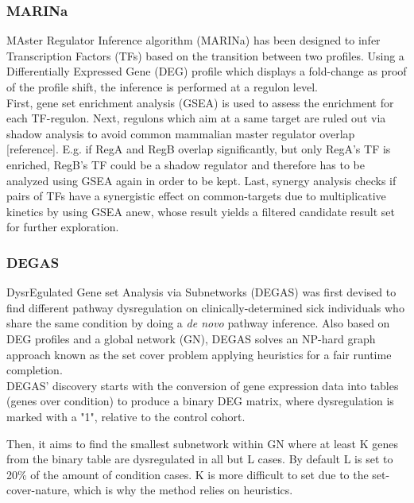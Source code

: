 \subsubsection{MARINa}
MAster Regulator Inference algorithm (MARINa) \cite{Lefebvre2010ACenters} has been designed to infer Transcription Factors (TFs) based on the transition between two profiles. Using a Differentially Expressed Gene (DEG) profile which displays a fold-change as proof of the profile shift, the inference is performed at a regulon level.
\\

First, gene set enrichment analysis (GSEA) \cite{Subramanian2005GeneProfiles} is used to assess the enrichment for each TF-regulon. Next, regulons which aim at a same target are ruled out via shadow analysis to avoid common mammalian master regulator overlap [reference]. E.g. if  RegA and RegB overlap significantly, but only RegA's TF is enriched, RegB’s TF could be a shadow regulator and therefore has to be analyzed using GSEA again in order to be kept.
Last, synergy analysis checks if pairs of TFs have a synergistic effect on common-targets due to multiplicative kinetics by using GSEA anew, whose result yields a filtered candidate result set for further exploration.

\subsubsection{DEGAS}
DysrEgulated Gene set Analysis via Subnetworks (DEGAS) \cite{Ulitsky2010DEGAS:Diseases} was first devised to find different pathway dysregulation on clinically-determined sick individuals who share the same condition by doing a \textit{de novo} pathway inference. Also based on DEG profiles and a global network (GN), DEGAS solves an NP-hard graph approach known as the set cover problem applying heuristics for a fair runtime completion.
\\

DEGAS’ discovery starts with the conversion of gene expression data into tables (genes over condition) to produce a binary DEG matrix, where dysregulation is marked with a "1", relative to the control cohort.

Then, it aims to find the smallest subnetwork within GN where at least K genes from the binary table are dysregulated in all but L cases. By default L is set to 20\% of the amount of condition cases. K is more difficult to set due to the set-cover-nature, which is why the method relies on heuristics. 
\\

